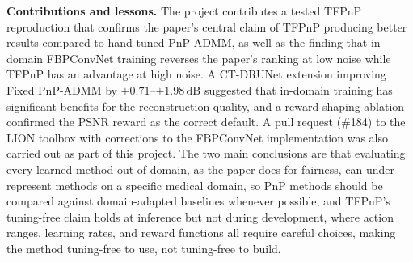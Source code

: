 \documentclass[11pt,a4paper]{article}
\begin{document}
\textbf{Contributions and lessons.} The project contributes a tested TFPnP reproduction that confirms the paper's central claim of TFPnP producing better results compared to hand-tuned PnP-ADMM, as well as the finding that in-domain FBPConvNet training reverses the paper's ranking at low noise while TFPnP has an advantage at high noise. A CT-DRUNet extension improving Fixed PnP-ADMM by $+0.71$--$+1.98$\,dB suggested that in-domain training has significant benefits for the reconstruction quality, and a reward-shaping ablation confirmed the PSNR reward as the correct default. A pull request (\#184) to the LION toolbox with corrections to the FBPConvNet implementation was also carried out as part of this project. The two main conclusions are that evaluating every learned method out-of-domain, as the paper does for fairness, can under-represent methods on a specific medical domain, so PnP methods should be compared against domain-adapted baselines whenever possible, and TFPnP's tuning-free claim holds at inference but not during development, where action ranges, learning rates, and reward functions all require careful choices, making the method tuning-free to use, not tuning-free to build.



\end{document}
